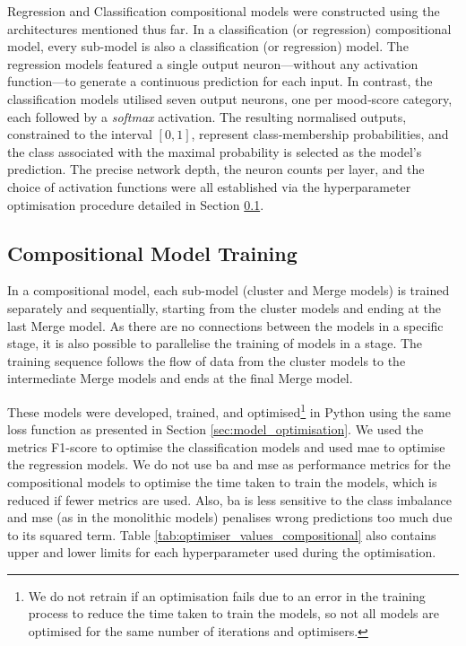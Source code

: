 Regression and Classification compositional models were constructed using the architectures mentioned thus far. In a classification (or regression) compositional model, every sub-model is also a classification (or regression) model. The regression models featured a single output neuron—without any activation function—to generate a continuous prediction for each input. In contrast, the classification models utilised seven output neurons, one per mood‐score category, each followed by a \textit{softmax} activation. The resulting normalised outputs, constrained to the interval \([0,1]\), represent class‐membership probabilities, and the class associated with the maximal probability is selected as the model's prediction. The precise network depth, the neuron counts per layer, and the choice of activation functions were all established via the hyperparameter optimisation procedure detailed in Section \ref{sec:compositional_model_training}.  



\subsection{Compositional Model Training}
\label{sec:compositional_model_training}

In a compositional model, each sub-model (cluster and Merge models) is trained separately and sequentially, starting from the cluster models and ending at the last Merge model. As there are no connections between the models in a specific stage, it is also possible to parallelise the training of models in a stage. The training sequence follows the flow of data from the cluster models to the intermediate Merge models and ends at the final Merge model. 

These models were developed, trained, and optimised\footnote{We do not retrain if an optimisation fails due to an error in the training process to reduce the time taken to train the models, so not all models are optimised for the same number of iterations and optimisers.} in Python using the same loss function as presented in Section \ref{sec:model_optimisation}. We used the metrics F1-score to optimise the classification models and used \gls{mae} to optimise the regression models. We do not use \gls{ba} and \gls{mse} as performance metrics for the compositional models to optimise the time taken to train the models, which is reduced if fewer metrics are used. Also, \gls{ba} is less sensitive to the class imbalance and \gls{mse} (as in the monolithic models) penalises wrong predictions too much due to its squared term. Table \ref{tab:optimiser_values_compositional} also contains upper and lower limits for each hyperparameter used during the optimisation.

